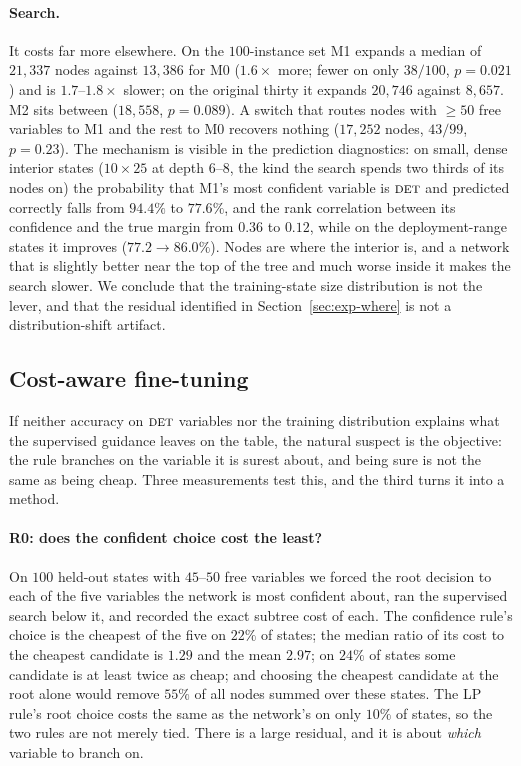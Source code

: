 \documentclass[preprint,12pt]{elsarticle}
\newcommand{\FORCED}{\textsc{det}}
\begin{document}
\paragraph{Search.} It costs far more elsewhere. On the $100$-instance set \textsc{M1} expands a median of $21{,}337$ nodes against $13{,}386$ for \textsc{M0} ($1.6\times$ more; fewer on only $38/100$, $p=0.021$) and is $1.7$--$1.8\times$ slower; on the original thirty it expands $20{,}746$ against $8{,}657$. \textsc{M2} sits between ($18{,}558$, $p=0.089$). A switch that routes nodes with $\ge50$ free variables to \textsc{M1} and the rest to \textsc{M0} recovers nothing ($17{,}252$ nodes, $43/99$, $p=0.23$). The mechanism is visible in the prediction diagnostics: on small, dense interior states ($10\times25$ at depth $6$--$8$, the kind the search spends two thirds of its nodes on) the probability that \textsc{M1}'s most confident variable is $\FORCED$ and predicted correctly falls from $94.4\%$ to $77.6\%$, and the rank correlation between its confidence and the true margin from $0.36$ to $0.12$, while on the deployment-range states it improves ($77.2\to86.0\%$). Nodes are where the interior is, and a network that is slightly better near the top of the tree and much worse inside it makes the search slower. We conclude that the training-state size distribution is not the lever, and that the residual identified in Section~\ref{sec:exp-where} is not a distribution-shift artifact.

\subsection{Cost-aware fine-tuning}
\label{sec:exp-rl}

If neither accuracy on $\FORCED$ variables nor the training distribution explains what the supervised guidance leaves on the table, the natural suspect is the objective: the rule branches on the variable it is surest about, and being sure is not the same as being cheap. Three measurements test this, and the third turns it into a method.

\paragraph{R0: does the confident choice cost the least?} On $100$ held-out states with $45$--$50$ free variables we forced the root decision to each of the five variables the network is most confident about, ran the supervised search below it, and recorded the exact subtree cost of each. The confidence rule's choice is the cheapest of the five on $22\%$ of states; the median ratio of its cost to the cheapest candidate is $1.29$ and the mean $2.97$; on $24\%$ of states some candidate is at least twice as cheap; and choosing the cheapest candidate at the root alone would remove $55\%$ of all nodes summed over these states. The LP rule's root choice costs the same as the network's on only $10\%$ of states, so the two rules are not merely tied. There is a large residual, and it is about \emph{which} variable to branch on.
\end{document}
